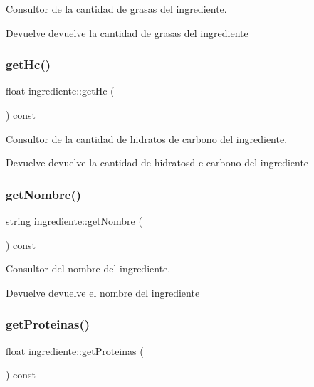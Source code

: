 Consultor de la cantidad de grasas del ingrediente. 

\begin{DoxyReturn}{Devuelve}
devuelve la cantidad de grasas del ingrediente 
\end{DoxyReturn}
\mbox{\label{classingrediente_a25b3b1bb017318d0aa9274484be7bc7a}} 
\subsubsection{\texorpdfstring{get\+Hc()}{getHc()}}
{\footnotesize\ttfamily float ingrediente\+::get\+Hc (\begin{DoxyParamCaption}{ }\end{DoxyParamCaption}) const}



Consultor de la cantidad de hidratos de carbono del ingrediente. 

\begin{DoxyReturn}{Devuelve}
devuelve la cantidad de hidratosd e carbono del ingrediente 
\end{DoxyReturn}
\mbox{\label{classingrediente_a8da227d03af8811627434703922b463a}} 
\subsubsection{\texorpdfstring{get\+Nombre()}{getNombre()}}
{\footnotesize\ttfamily string ingrediente\+::get\+Nombre (\begin{DoxyParamCaption}{ }\end{DoxyParamCaption}) const}



Consultor del nombre del ingrediente. 

\begin{DoxyReturn}{Devuelve}
devuelve el nombre del ingrediente 
\end{DoxyReturn}
\mbox{\label{classingrediente_a64258034d6cf7c70cb496dc91c7ab0fa}} 
\subsubsection{\texorpdfstring{get\+Proteinas()}{getProteinas()}}
{\footnotesize\ttfamily float ingrediente\+::get\+Proteinas (\begin{DoxyParamCaption}{ }\end{DoxyParamCaption}) const}



